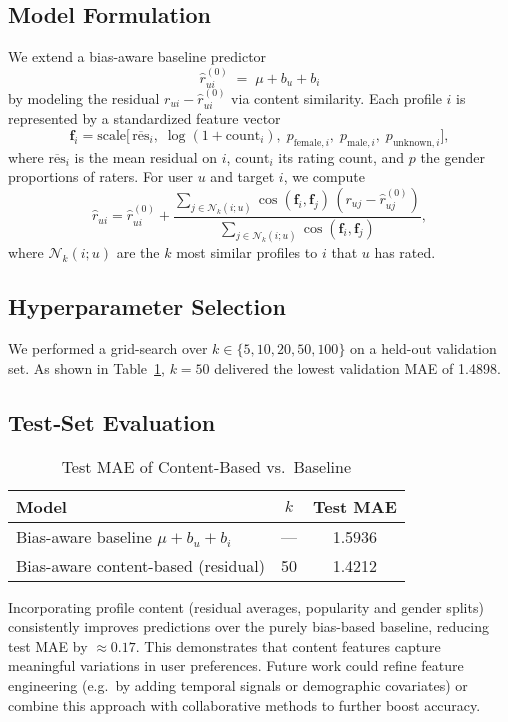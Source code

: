 \subsection*{Model Formulation}
We extend a bias-aware baseline predictor 
\[
  \hat r_{ui}^{(0)} \;=\; \mu + b_u + b_i
\]
by modeling the residual \(r_{ui} - \hat r_{ui}^{(0)}\) via content similarity.  Each profile \(i\) is represented by a standardized feature vector 
\[
  \mathbf{f}_i = \mathrm{scale}\bigl[\,
    \overline{\mathrm{res}}_i,\;
    \log(1 + \mathrm{count}_i),\;
    p_{\mathrm{female},i},\;
    p_{\mathrm{male},i},\;
    p_{\mathrm{unknown},i}
  \bigr],
\]
where \(\overline{\mathrm{res}}_i\) is the mean residual on \(i\), \(\mathrm{count}_i\) its rating count, and \(p\) the gender proportions of raters.  For user \(u\) and target \(i\), we compute
\[
  \hat r_{ui}
  = \hat r_{ui}^{(0)}
  + \frac{\sum_{j\in\mathcal N_k(i;u)} 
               \cos(\mathbf f_i,\mathbf f_j)\,(r_{uj} - \hat r_{uj}^{(0)})}
         {\sum_{j\in\mathcal N_k(i;u)} \cos(\mathbf f_i,\mathbf f_j)},
\]
where \(\mathcal N_k(i;u)\) are the \(k\) most similar profiles to \(i\) that \(u\) has rated.

\subsection*{Hyperparameter Selection}
We performed a grid-search over \(k\in\{5,10,20,50,100\}\) on a held-out validation set.  As shown in Table~\ref{tab:cbf}, \(k=50\) delivered the lowest validation MAE of 1.4898.

\subsection*{Test‐Set Evaluation}
\begin{table}[H]
  \centering
  \caption{Test MAE of Content-Based vs.\ Baseline}
  \label{tab:cbf}
  \begin{tabular}{@{}lcc@{}}
    \toprule
    Model                            & \(k\) & Test MAE \\ 
    \midrule
    Bias-aware baseline \(\mu+b_u+b_i\)     & —     & 1.5936   \\
    Bias-aware content-based (residual)     & 50    & 1.4212   \\
    \bottomrule
  \end{tabular}
\end{table}

Incorporating profile content (residual averages, popularity and gender splits) consistently improves predictions over the purely bias-based baseline, reducing test MAE by \(\approx\!0.17\).  This demonstrates that content features capture meaningful variations in user preferences.  Future work could refine feature engineering (e.g.\ by adding temporal signals or demographic covariates) or combine this approach with collaborative methods to further boost accuracy.